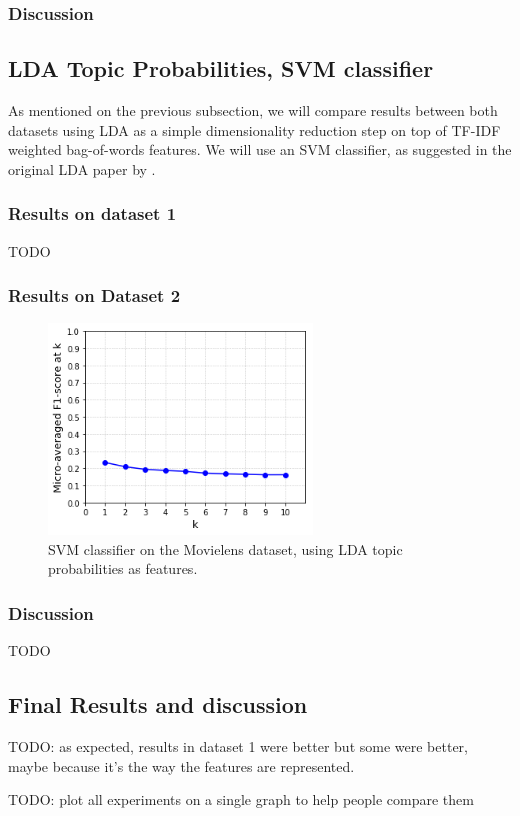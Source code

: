 \subsubsection{Discussion}

\subsection{LDA Topic Probabilities, SVM classifier}

As mentioned on the previous subsection, we will compare results between both datasets using LDA as a simple dimensionality reduction step on top of TF-IDF weighted bag-of-words features. We will use an SVM classifier, as suggested in the original LDA paper by \cite{blei_etal_2003}.

\subsubsection{Results on dataset 1}

{\color{red} TODO}

\subsubsection{Results on Dataset 2}

\begin{figure}[H]
    \centering
    \includegraphics[width=7cm]{chapters/05_experiments/images/svm-lda-tf-idf-movielens.png}
    \caption{SVM classifier on the Movielens dataset, using LDA topic probabilities as features.}
    \label{fig:svm_lda_movielens}
\end{figure}

\subsubsection{Discussion}

{\color{red} TODO}

\subsection{Final Results and discussion}

{\color{red} TODO: as expected, results in dataset 1 were better but some were better, maybe because it's the way the features are represented.}

{\color{red} TODO: plot all experiments on a single graph to help people compare them}
